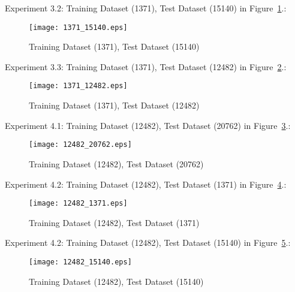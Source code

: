 Experiment 3.2: Training Dataset  (1371), Test Dataset  (15140) in Figure~\ref{fig:fig7}.:
\begin{figure}[h]
\centering
\texttt{[image: 1371\_15140.eps]}
\caption{Training Dataset  (1371), Test Dataset  (15140)}
\label{fig:fig7}
\end{figure}

Experiment 3.3: Training Dataset  (1371), Test Dataset  (12482) in Figure~\ref{fig:fig8}.:
\begin{figure}[h]
\centering
\texttt{[image: 1371\_12482.eps]}
\caption{Training Dataset  (1371), Test Dataset  (12482)}
\label{fig:fig8}
\end{figure}

Experiment 4.1: Training Dataset  (12482), Test Dataset  (20762) in Figure~\ref{fig:fig9}.:
\begin{figure}[h]
\centering
\texttt{[image: 12482\_20762.eps]}
\caption{Training Dataset  (12482), Test Dataset  (20762)}
\label{fig:fig9}
\end{figure}

Experiment 4.2: Training Dataset  (12482), Test Dataset  (1371) in Figure~\ref{fig:fig10}.:
\begin{figure}[h]
\centering
\texttt{[image: 12482\_1371.eps]}
\caption{Training Dataset  (12482), Test Dataset  (1371)}
\label{fig:fig10}
\end{figure}

Experiment 4.2: Training Dataset  (12482), Test Dataset  (15140) in Figure~\ref{fig:fig11}.:
\begin{figure}[h]
\centering
\texttt{[image: 12482\_15140.eps]}
\caption{Training Dataset  (12482), Test Dataset  (15140)}
\label{fig:fig11}
\end{figure}

\fi


